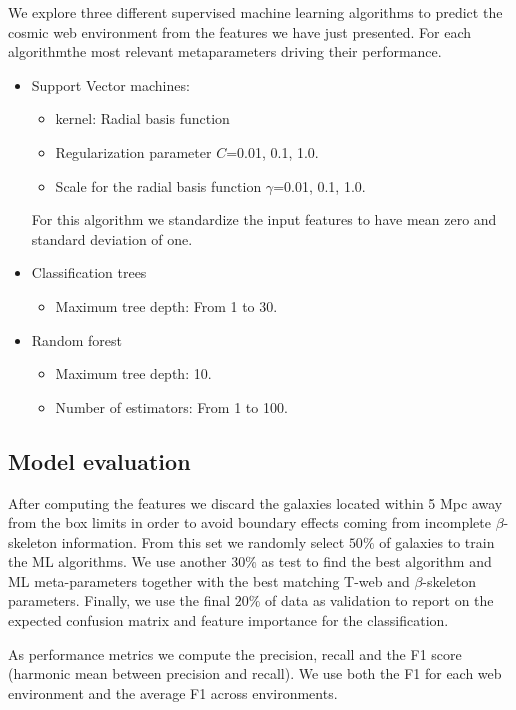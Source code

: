 \documentclass[usenatbib]{mnras}
\begin{document}
We explore three different supervised machine learning algorithms to
predict the cosmic web environment from the features we have just
presented. 
For each algorithmthe most relevant metaparameters driving their
performance.

\begin{itemize}
    \item Support Vector machines: 
        \begin{itemize}
            \item kernel: Radial basis function
            \item Regularization parameter $C$=0.01, 0.1, 1.0.
            \item Scale for the radial basis function  $\gamma$=0.01, 0.1, 1.0.
        \end{itemize}
        For this algorithm we standardize the input features to have
        mean zero and standard deviation of one. 
    \item Classification trees
      \begin{itemize}
      \item Maximum tree depth: From 1 to 30.
      \end{itemize}
    \item Random forest
        \begin{itemize}
            \item Maximum tree depth: 10.
            \item Number of estimators: From 1 to 100.
        \end{itemize}
\end{itemize}

\subsection{Model evaluation}

After computing the features we discard the galaxies located within 5 Mpc
away from the box limits  in order  to avoid boundary effects coming
from incomplete $\beta$-skeleton information.  
From this set we randomly select $50\%$ of galaxies to train the ML
algorithms.   
We use another $30\%$ as test to find the best algorithm and ML
meta-parameters together with the best matching T-web and
$\beta$-skeleton parameters.   
Finally, we use the final $20 \%$ of data as validation to  report
on the expected confusion matrix and feature importance for the
classification. 

As performance metrics we compute the precision, recall and the F1
score (harmonic mean between precision and recall).  
We use both the F1 for each web environment and the average F1 across
environments. 
\end{document}
